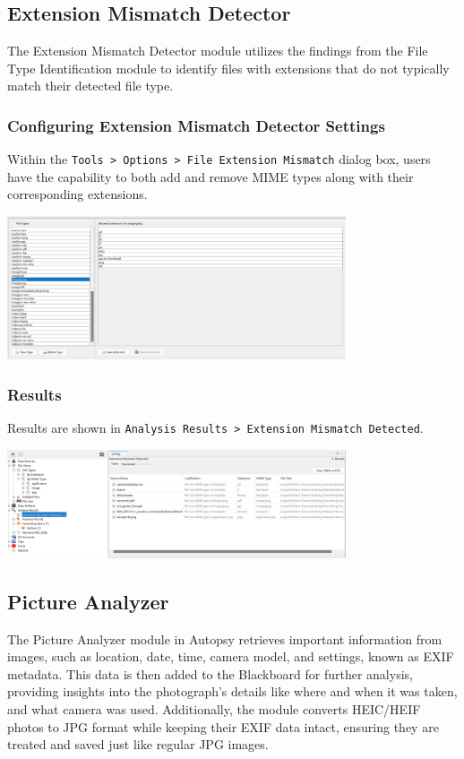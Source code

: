 \documentclass{extarticle}
\begin{document}
\subsection{Extension Mismatch Detector}
The Extension Mismatch Detector module utilizes the findings from the File Type Identification module to identify files with extensions that do not typically match their detected file type.

\subsubsection*{Configuring Extension Mismatch Detector Settings}
Within the \lstinline{Tools > Options > File Extension Mismatch} dialog box, users have the capability to both add and remove MIME types along with their corresponding extensions.

\begin{center}
    \includegraphics[width=0.75\textwidth]{3/3.5/Extension Mismatch Detector Settings .png}
\end{center}

\subsubsection*{Results}
Results are shown in \texttt{Analysis Results > Extension Mismatch Detected}.

\begin{center}
    \includegraphics[width=0.75\textwidth]{3/3.5/Details of Mismatched Files.png}
\end{center}

\subsection{Picture Analyzer}
The Picture Analyzer module in Autopsy retrieves important information from images, such as location, date, time, camera model, and settings, known as EXIF metadata. This data is then added to the Blackboard for further analysis, providing insights into the photograph's details like where and when it was taken, and what camera was used. Additionally, the module converts HEIC/HEIF photos to JPG format while keeping their EXIF data intact, ensuring they are treated and saved just like regular JPG images.
\end{document}
